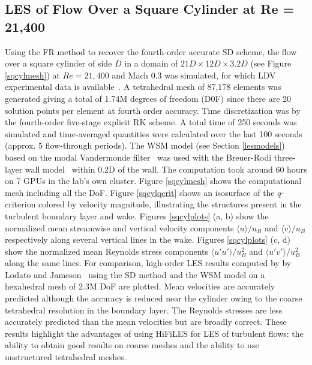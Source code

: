 \graphicspath{{figures_squarecylinder/}}%

\subsection{LES of Flow Over a Square Cylinder at Re = 21,400}\label{sqcyl}

Using the FR method to recover the fourth-order accurate SD scheme, the flow over a square cylinder of side $D$ in a domain of $21D \times 12D \times 3.2D$ (see Figure \ref{sqcylmesh}) at $Re = 21,400$ and Mach 0.3 was simulated, for which LDV experimental data is available~\cite{lyn1994,lyn1995}.
A tetrahedral mesh of 87,178 elements was generated giving a total of 1.74M degrees of freedom (D0F) since there are 20 solution points per element at fourth order accuracy.
Time discretization was by the fourth-order five-stage explicit RK scheme.
A total time of 250 seconds was simulated and time-averaged quantities were calculated over the last 100 seconds (approx. 5 flow-through periods).
The WSM model (see Section \ref{lesmodels}) based on the modal Vandermonde filter~\cite{bull2013a} was used with the Breuer-Rodi three-layer wall model~\cite{breuer1994} within 0.2D of the wall.
The computation took around 60 hours on 7 GPUs in the lab's own cluster.
Figure \ref{sqcylmesh} shows the computational mesh including all the DoF.
Figure \ref{sqcylqcrit} shows an isosurface of the $q$-criterion colored by velocity magnitude, illustrating the structures present in the turbulent boundary layer and wake.
Figures \ref{sqcylplots} (a, b) show the normalized mean streamwise and vertical velocity components $\langle u \rangle/u_B$ and $\langle v \rangle/u_B$ respectively along several vertical lines in the wake.
Figures \ref{sqcylplots} (c, d) show the normalized mean Reynolds stress components $\langle u'u' \rangle/u_B^2$ and $\langle u'v' \rangle/u_B^2$ along the same lines.
For comparison, high-order LES results computed by by Lodato and Jameson~\cite{lodato2012b} using the SD method and the WSM model on a hexahedral mesh of 2.3M DoF are plotted.
Mean velocities are accurately predicted although the accuracy is reduced near the cylinder owing to the coarse tetrahedral resolution in the boundary layer.
The Reynolds stresses are less accurately predicted than the mean velocities but are broadly correct.
These results highlight the advantages of using HiFiLES for LES of turbulent flows: the ability to obtain good results on coarse meshes and the ability to use unstructured tetrahedral meshes.



